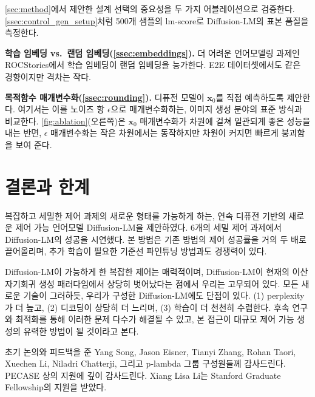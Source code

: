 \documentclass{article}
\newcommand{\cx}[1]{\mathbf{x}_{#1}}
\begin{document}
\cref{sec:method}에서 제안한 설계 선택의 중요성을 두 가지 어블레이션으로 검증한다. \cref{ssec:control_gen_setup}처럼 500개 샘플의 lm-score로 Diffusion-LM의 표본 품질을 측정한다.

\textbf{학습 임베딩 vs.\ 랜덤 임베딩(\cref{ssec:embeddings}).}
더 어려운 언어모델링 과제인 ROCStories에서 학습 임베딩이 랜덤 임베딩을 능가한다. E2E 데이터셋에서도 같은 경향이지만 격차는 작다.


\textbf{목적함수 매개변수화(\cref{ssec:rounding}).}
디퓨전 모델이 $\cx{0}$를 직접 예측하도록 제안한다. 여기서는 이를 노이즈 항 $\epsilon$으로 매개변수화하는, 이미지 생성 분야의 표준 방식과 비교한다. \cref{fig:ablation}(오른쪽)은 $\cx{0}$ 매개변수화가 차원에 걸쳐 일관되게 좋은 성능을 내는 반면, $\epsilon$ 매개변수화는 작은 차원에서는 동작하지만 차원이 커지면 빠르게 붕괴함을 보여 준다.




\section{결론과 한계}
복잡하고 세밀한 제어 과제의 새로운 형태를 가능하게 하는, 연속 디퓨전 기반의 새로운 제어 가능 언어모델 Diffusion-LM을 제안하였다.
6개의 세밀 제어 과제에서 Diffusion-LM의 성공을 시연했다. 본 방법은 기존 방법의 제어 성공률을 거의 두 배로 끌어올리며, 추가 학습이 필요한 기준선 파인튜닝 방법과도 경쟁력이 있다.

Diffusion-LM이 가능하게 한 복잡한 제어는 매력적이며, Diffusion-LM이 현재의 이산 자기회귀 생성 패러다임에서 상당히 벗어났다는 점에서 우리는 고무되어 있다. 모든 새로운 기술이 그러하듯, 우리가 구성한 Diffusion-LM에도 단점이 있다. (1) perplexity가 더 높고, (2) 디코딩이 상당히 더 느리며, (3) 학습이 더 천천히 수렴한다. 후속 연구와 최적화를 통해 이러한 문제 다수가 해결될 수 있고, 본 접근이 대규모 제어 가능 생성의 유력한 방법이 될 것이라고 본다.



\begin{ack}
초기 논의와 피드백을 준 Yang Song, Jason Eisner, Tianyi Zhang, Rohan Taori, Xuechen Li, Niladri Chatterji, 그리고 p-lambda 그룹 구성원들께 감사드린다. PECASE 상의 지원에 깊이 감사드린다.
Xiang Lisa Li는 Stanford Graduate Fellowship의 지원을 받았다.
\end{ack}







\end{document}
